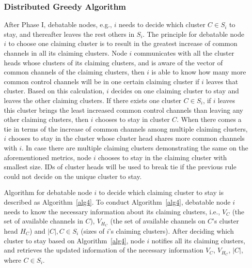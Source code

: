 \documentclass[10pt,journal,compsoc]{IEEEtran}
\theoremstyle{mytheoremstyle}
\theoremstyle{mytheoremstyle}
\theoremstyle{mytheoremstyle}
\newcommand{\eg}{e.g., }
\newcommand{\ie}{i.e., }
\begin{document}
\subsubsection{Distributed Greedy Algorithm}
After Phase I, debatable nodes, \eg $i$ needs to decide which cluster $C\in S_i$ to stay, and thereafter leaves the rest others in $S_i$.
The principle for debatable node $i$ to choose one claiming cluster is to result in the greatest increase of common channels in all its claiming clusters.
Node $i$ communicates with all the cluster heads whose clusters of its claiming clusters, and is aware of the vector of common channels of the claiming clusters, then $i$ is able to know how many more common control channels will be in one certain claiming cluster if $i$ leaves that cluster.
Based on this calculation, $i$ decides on one claiming cluster to stay and leaves the other claiming clusters.
If there exists one cluster $C\in S_i$, if $i$ leaves this cluster brings the least increased common control channels than leaving any other claiming clusters, then $i$ chooses to stay in cluster $C$.
When there comes a tie in terms of the increase of common channels among multiple claiming clusters, $i$ chooses to stay in the cluster whose cluster head shares more common channels with $i$.
In case there are multiple claiming clusters demonstrating the same on the aforementioned metrics, node $i$ chooses to stay in the claiming cluster with smallest size.
IDs of cluster heads will be used to break tie if the previous rule could not decide on the unique cluster to stay.

Algorithm for debatable node $i$ to decide which claiming cluster to stay is described as Algorithm~\ref{alg4}.
To conduct Algorithm~\ref{alg4}, debatable node $i$ needs to know the necessary information about its claiming clusters, \ie $V_C$ (the set of available channels in $C$), $V_{H_C}$ (the set of available channels on $C$'s cluster head $H_C$) and $|C|, C\in S_i$ (sizes of $i$'s claiming clusters).
After deciding which cluster to stay based on Algorithm~\ref{alg4}, node $i$ notifies all its claiming clusters, and retrieves the updated information of the necessary information $V_C$, $V_{H_C}$, $|C|$, where $C\in S_i$.
\end{document}

